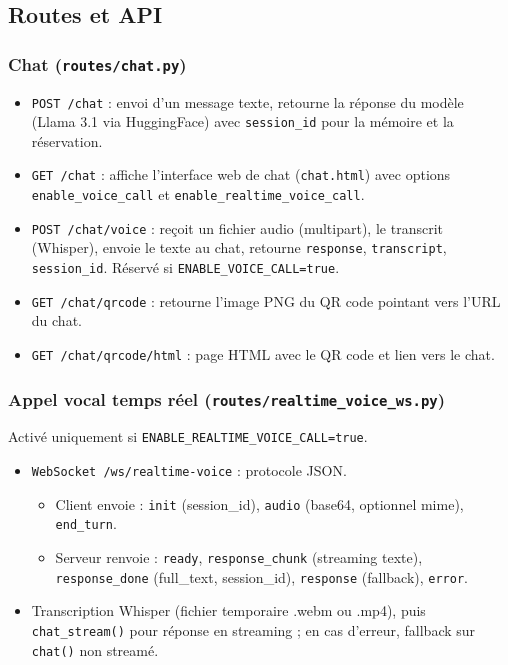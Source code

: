 \documentclass[12pt,a4paper]{article}
\begin{document}
\subsection{Routes et API}

\subsubsection{Chat (\texttt{routes/chat.py})}

\begin{itemize}[noitemsep]
  \item \texttt{POST /chat} : envoi d'un message texte, retourne la réponse du modèle (Llama 3.1 via HuggingFace) avec \texttt{session\_id} pour la mémoire et la réservation.
  \item \texttt{GET /chat} : affiche l'interface web de chat (\texttt{chat.html}) avec options \texttt{enable\_voice\_call} et \texttt{enable\_realtime\_voice\_call}.
  \item \texttt{POST /chat/voice} : reçoit un fichier audio (multipart), le transcrit (Whisper), envoie le texte au chat, retourne \texttt{response}, \texttt{transcript}, \texttt{session\_id}. Réservé si \texttt{ENABLE\_VOICE\_CALL=true}.
  \item \texttt{GET /chat/qrcode} : retourne l'image PNG du QR code pointant vers l'URL du chat.
  \item \texttt{GET /chat/qrcode/html} : page HTML avec le QR code et lien vers le chat.
\end{itemize}

\subsubsection{Appel vocal temps réel (\texttt{routes/realtime\_voice\_ws.py})}

Activé uniquement si \texttt{ENABLE\_REALTIME\_VOICE\_CALL=true}.

\begin{itemize}[noitemsep]
  \item \texttt{WebSocket /ws/realtime-voice} : protocole JSON.
  \begin{itemize}[noitemsep]
    \item Client envoie : \texttt{init} (session\_id), \texttt{audio} (base64, optionnel mime), \texttt{end\_turn}.
    \item Serveur renvoie : \texttt{ready}, \texttt{response\_chunk} (streaming texte), \texttt{response\_done} (full\_text, session\_id), \texttt{response} (fallback), \texttt{error}.
  \end{itemize}
  \item Transcription Whisper (fichier temporaire .webm ou .mp4), puis \texttt{chat\_stream()} pour réponse en streaming ; en cas d'erreur, fallback sur \texttt{chat()} non streamé.
\end{itemize}
\end{document}
